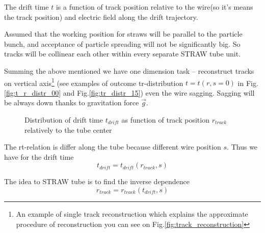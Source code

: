 \documentclass[]{article}
\begin{document}
	The drift time $t$ is a function of track position relative to the wire(so it's means the track position) and electric field along the drift trajectory.
	
	Assumed that the working  position  for straws will be parallel to the particle bunch, and  acceptance of particle spreading will not be significantly big. So tracks will be collinear each other within every separate  STRAW tube unit.
	
	Summing the above mentioned we have one dimension task -- reconstruct tracks on vertical axis\footnote{An example of single track reconstruction which explains the approximate procedure of reconstruction you can see on Fig.\ref{fig:track_reconstruction}}	(see examples of outcome tr-distribution $t = t(r,s=0)$ in Fig.\ref{fig:t_r_distr_00} and Fig.\ref{fig:tr_distr_15})  even the wire sagging. Sagging will be always down thanks to gravitation force $\vec{g}$.
	
	\begin{figure}[h!]
		\centering
		\qquad
		\caption{Distribution of drift time $t_{drift}$ as function of track position $r_{track}$ relatively to the tube center}			
	\end{figure}	
	
	The rt-relation is differ along the tube because different wire position $s$. Thus we have for the drift time 
	\begin{equation}
	t_{drift} = t_{drift}(r_{track},s)
	\end{equation}
	
	The idea to STRAW tube is to find the inverse dependence
	\begin{equation}
		r_{track} = r_{track}(t_{drift},s)
	\end{equation}
	
\end{document}

